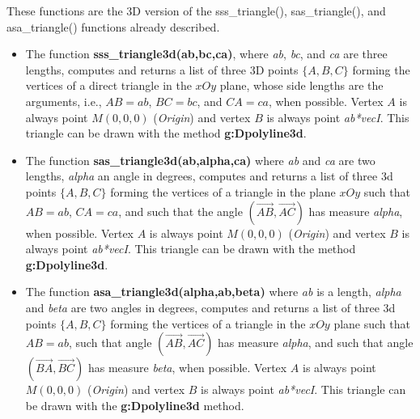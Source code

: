 These functions are the 3D version of the sss\_triangle(), sas\_triangle(), and asa\_triangle() functions already described.
\begin{itemize}
    \item The function \textbf{sss\_triangle3d(ab,bc,ca)}, where \emph{ab}, \emph{bc}, and \emph{ca} are three lengths, computes and returns a list of three 3D points $\{A,B,C\}$ forming the vertices of a direct triangle in the $xOy$ plane, whose side lengths are the arguments, i.e., $AB=ab$, $BC=bc$, and $CA=ca$, when possible. Vertex $A$ is always point $M(0,0,0)$ (\emph{Origin}) and vertex $B$ is always point \emph{ab*vecI}. This triangle can be drawn with the method \textbf{g:Dpolyline3d}.
    \item The function \textbf{sas\_triangle3d(ab,alpha,ca)} where \emph{ab} and \emph{ca} are two lengths, \emph{alpha} an angle in degrees, computes and returns a list of three 3d points $\{A,B,C\}$ forming the vertices of a triangle in the plane $xOy$ such that $AB=ab$, $CA=ca$, and such that the angle $(\vec{AB},\vec{AC})$ has measure \emph{alpha}, when possible. Vertex $A$ is always point $M(0,0,0)$ (\emph{Origin}) and vertex $B$ is always point \emph{ab*vecI}. This triangle can be drawn with the method \textbf{g:Dpolyline3d}.
    \item The function \textbf{asa\_triangle3d(alpha,ab,beta)} where \emph{ab} is a length, \emph{alpha} and \emph{beta} are two angles in degrees, computes and returns a list of three 3d points $\{A,B,C\}$ forming the vertices of a triangle in the $xOy$ plane such that $AB=ab$, such that angle $(\vec{AB},\vec{AC})$ has measure \emph{alpha}, and such that angle $(\vec{BA},\vec{BC})$ has measure \emph{beta}, when possible. Vertex $A$ is always point $M(0,0,0)$ (\emph{Origin}) and vertex $B$ is always point \emph{ab*vecI}. This triangle can be drawn with the \textbf{g:Dpolyline3d} method.
\end{itemize}
